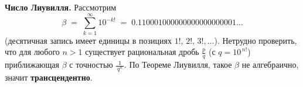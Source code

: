 \begin{customexample}
	\textbf{Число Лиувилля.}
	Рассмотрим
	\[
		\beta
		\;=\;
		\sum_{k=1}^{\infty} 10^{-k!}
		\;=\;
		0.110001000000000000000001\dots
	\]
	(десятичная запись имеет единицы в позициях $1!,\,2!,\,3!,\dots$).
	Нетрудно проверить, что для любого $n>1$ существует рациональная дробь
	$\tfrac{p}{q}$ (с $q=10^{\,n!}$) приближающая $\beta$ с точностью
	\(\frac{1}{\,q^n\,}\). По Теореме Лиувилля, такое $\beta$ не алгебраично,
	значит \textbf{трансцендентно}.
\end{customexample}
